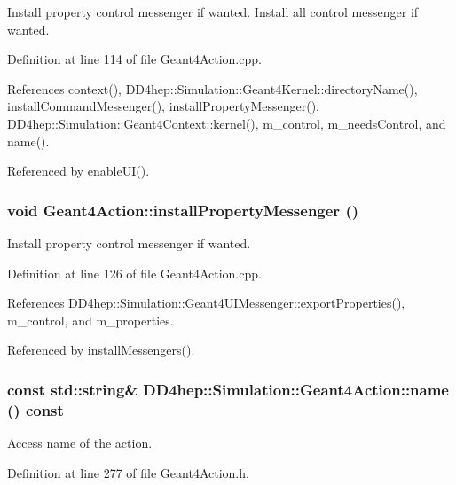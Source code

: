 Install property control messenger if wanted. Install all control messenger if wanted. 

Definition at line 114 of file Geant4Action.cpp.

References context(), DD4hep::Simulation::Geant4Kernel::directoryName(), installCommandMessenger(), installPropertyMessenger(), DD4hep::Simulation::Geant4Context::kernel(), m\_\-control, m\_\-needsControl, and name().

Referenced by enableUI().\hypertarget{class_d_d4hep_1_1_simulation_1_1_geant4_action_a04fb6b6b16ed0aad5f552e04d99d278f}{
\subsubsection[{installPropertyMessenger}]{\setlength{\rightskip}{0pt plus 5cm}void Geant4Action::installPropertyMessenger ()}}
\label{class_d_d4hep_1_1_simulation_1_1_geant4_action_a04fb6b6b16ed0aad5f552e04d99d278f}


Install property control messenger if wanted. 

Definition at line 126 of file Geant4Action.cpp.

References DD4hep::Simulation::Geant4UIMessenger::exportProperties(), m\_\-control, and m\_\-properties.

Referenced by installMessengers().\hypertarget{class_d_d4hep_1_1_simulation_1_1_geant4_action_a3471b931eb84ab4fdc3fc4beddae512b}{
\subsubsection[{name}]{\setlength{\rightskip}{0pt plus 5cm}const std::string\& DD4hep::Simulation::Geant4Action::name () const}}
\label{class_d_d4hep_1_1_simulation_1_1_geant4_action_a3471b931eb84ab4fdc3fc4beddae512b}


Access name of the action. 

Definition at line 277 of file Geant4Action.h.

